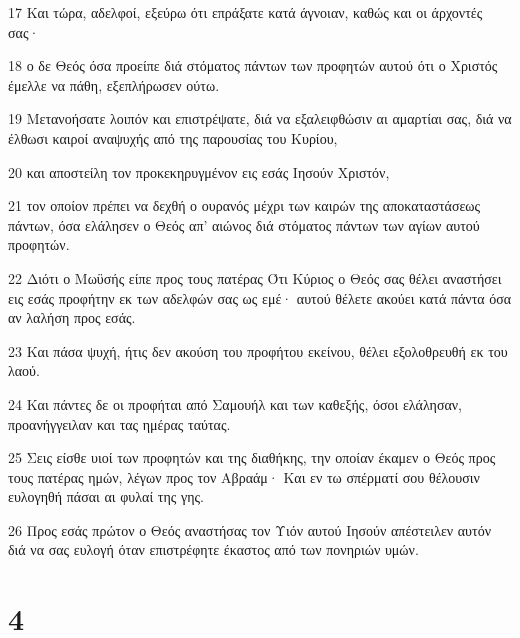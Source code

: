 \par 17 Και τώρα, αδελφοί, εξεύρω ότι επράξατε κατά άγνοιαν, καθώς και οι άρχοντές σας·
\par 18 ο δε Θεός όσα προείπε διά στόματος πάντων των προφητών αυτού ότι ο Χριστός έμελλε να πάθη, εξεπλήρωσεν ούτω.
\par 19 Μετανοήσατε λοιπόν και επιστρέψατε, διά να εξαλειφθώσιν αι αμαρτίαι σας, διά να έλθωσι καιροί αναψυχής από της παρουσίας του Κυρίου,
\par 20 και αποστείλη τον προκεκηρυγμένον εις εσάς Ιησούν Χριστόν,
\par 21 τον οποίον πρέπει να δεχθή ο ουρανός μέχρι των καιρών της αποκαταστάσεως πάντων, όσα ελάλησεν ο Θεός απ' αιώνος διά στόματος πάντων των αγίων αυτού προφητών.
\par 22 Διότι ο Μωϋσής είπε προς τους πατέρας Ότι Κύριος ο Θεός σας θέλει αναστήσει εις εσάς προφήτην εκ των αδελφών σας ως εμέ· αυτού θέλετε ακούει κατά πάντα όσα αν λαλήση προς εσάς.
\par 23 Και πάσα ψυχή, ήτις δεν ακούση του προφήτου εκείνου, θέλει εξολοθρευθή εκ του λαού.
\par 24 Και πάντες δε οι προφήται από Σαμουήλ και των καθεξής, όσοι ελάλησαν, προανήγγειλαν και τας ημέρας ταύτας.
\par 25 Σεις είσθε υιοί των προφητών και της διαθήκης, την οποίαν έκαμεν ο Θεός προς τους πατέρας ημών, λέγων προς τον Αβραάμ· Και εν τω σπέρματί σου θέλουσιν ευλογηθή πάσαι αι φυλαί της γης.
\par 26 Προς εσάς πρώτον ο Θεός αναστήσας τον Υιόν αυτού Ιησούν απέστειλεν αυτόν διά να σας ευλογή όταν επιστρέφητε έκαστος από των πονηριών υμών.

\chapter{4}

